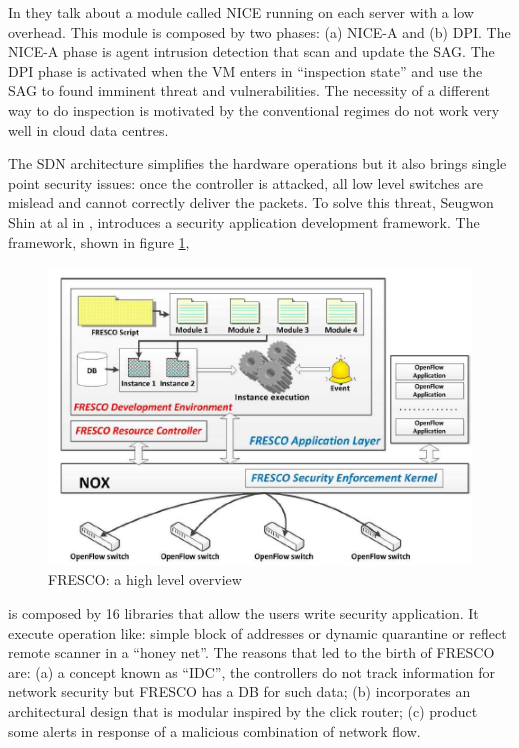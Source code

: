 In \cite{sdn-and-openflow-from-concept-to-implementation:NICE} they talk about a module called \ac{NICE} running on each server with a low overhead. This module is composed by two phases: (a) \ac{NICE}-A and (b) \ac{DPI}. The \ac{NICE}-A phase is agent intrusion detection that scan and update the \ac{SAG}. The \ac{DPI} phase is activated when the \ac{VM} enters in ``inspection state'' and use the \ac{SAG} to found imminent threat and vulnerabilities. The necessity of a different way to do inspection is motivated by the conventional regimes do not work very well in cloud data centres.

The \ac{SDN} architecture simplifies the hardware operations but it also brings single point security issues: once the controller is attacked, all low level switches are mislead and cannot correctly deliver the packets. To solve this threat, Seugwon Shin at al in \cite{fresco-services}, introduces a security application development framework. The framework, shown in figure \ref{fig:security-enhancement-using-SDN:FRESCO},

\begin{figure}
\centering
\includegraphics[scale=0.5]{Introduction/Image/FrescoStructure.png}
\caption{FRESCO: a high level overview}
\label{fig:security-enhancement-using-SDN:FRESCO}
\end{figure}

is composed by 16 libraries that allow the users write security application. It execute operation like: simple block of addresses or dynamic quarantine or reflect remote scanner in a ``honey net''. The reasons that led to the birth of FRESCO are: (a) a concept known as ``\ac{IDC}'', the controllers do not track information for network security but FRESCO has a \ac{DB} for such data; (b) incorporates an architectural design that is modular inspired by the click router; (c) product some alerts in response of a malicious combination of network flow.

